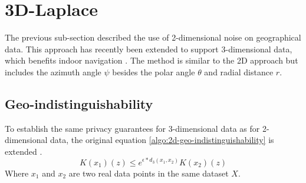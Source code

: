 \section{3D-Laplace}
The previous sub-section described the use of 2-dimensional noise on geographical data.
This approach has recently been extended to support 3-dimensional data, which benefits indoor navigation \citep{9646489}.
The method is similar to the 2D approach but includes the azimuth angle $\psi$ besides the polar angle $\theta$ and radial distance $r$.

\subsection{Geo-indistinguishability}
To establish the same privacy guarantees for 3-dimensional data as for 2-dimensional data, the original equation \ref{algo:2d-geo-indistinguishability} is extended \citep{9646489}.
\begin{equation}
  K(x_1)(z) \le e^{\epsilon * d_3(x_1, x_2)} K(x_2)(z)
  \label{algo:3d-geo-indistinguishability}
\end{equation}
Where $x_1$ and $x_2$ are two real data points in the same dataset $X$.
